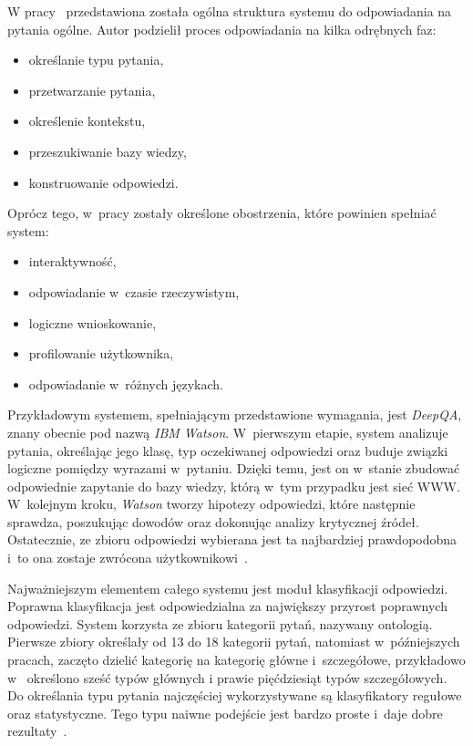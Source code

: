 W pracy~\cite{lapshin2012question} przedstawiona została ogólna struktura systemu do odpowiadania na pytania ogólne. Autor podzielił proces odpowiadania na kilka odrębnych faz:
\begin{itemize}
    \item określanie typu pytania,
    \item przetwarzanie pytania,
    \item określenie kontekstu,
    \item przeszukiwanie bazy wiedzy,
    \item konstruowanie odpowiedzi.
\end{itemize}

Oprócz tego, w~pracy zostały określone obostrzenia, które powinien spełniać system:
\begin{itemize}
    \item interaktywność,
    \item odpowiadanie w~czasie rzeczywistym,
    \item logiczne wnioskowanie,
    \item profilowanie użytkownika,
    \item odpowiadanie w~różnych językach.
\end{itemize}

Przykładowym systemem, spełniającym przedstawione wymagania, jest \emph{DeepQA}, znany obecnie pod nazwą \emph{IBM Watson}. W~pierwszym etapie, system analizuje pytania, określając jego klasę, typ oczekiwanej odpowiedzi oraz buduje związki logiczne pomiędzy wyrazami w~pytaniu. Dzięki temu, jest on w~stanie zbudować odpowiednie zapytanie do bazy wiedzy, którą w~tym przypadku jest sieć WWW. W~kolejnym kroku, \emph{Watson} tworzy hipotezy odpowiedzi, które następnie sprawdza, poszukując dowodów oraz dokonując analizy krytycznej źródeł. Ostatecznie, ze zbioru odpowiedzi wybierana jest ta najbardziej prawdopodobna i~to ona zostaje zwrócona użytkownikowi~\cite{lapshin2012question}.

Najważniejszym elementem całego systemu jest moduł klasyfikacji odpowiedzi. Poprawna klasyfikacja jest odpowiedzialna za największy przyrost poprawnych odpowiedzi. System korzysta ze zbioru kategorii pytań, nazywany ontologią. Pierwsze zbiory określały od 13 do 18 kategorii pytań, natomiast w~późniejszych pracach, zaczęto dzielić kategorię na kategorię główne i~szczegółowe, przykładowo w~\cite{li2002learning} określono sześć typów głównych i prawie pięćdziesiąt typów szczegółowych. Do określania typu pytania najczęściej wykorzystywane są klasyfikatory regułowe oraz statystyczne. Tego typu naiwne podejście jest bardzo proste i~daje dobre rezultaty~\cite{lapshin2012question}.


